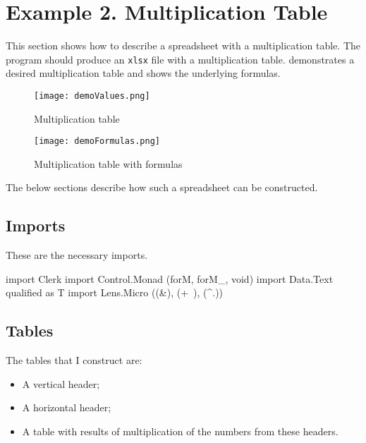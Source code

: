 


\section{Example 2. Multiplication Table}
\label{sec:ex2}

This section shows how to describe a spreadsheet with a multiplication table. The program should produce an \texttt{xlsx} file with a multiplication table.  demonstrates a desired multiplication table and  shows the underlying formulas.

\begin{figure}[h]
  \centering
  \texttt{[image: demoValues.png]}
  \caption{Multiplication table}
  \label{fig:mult}
\end{figure}

\begin{figure}[h]
  \centering
  \texttt{[image: demoFormulas.png]}
  \caption{Multiplication table with formulas}
  \label{fig:mult_formulas}
\end{figure}

The below sections describe how such a spreadsheet can be constructed.

\subsection{Imports}

These are the necessary imports.

\begin{mycode}
import Clerk
import Control.Monad (forM, forM_, void)
import Data.Text qualified as T
import Lens.Micro ((&), (+~), (^.))
\end{mycode}

\subsection{Tables}

The tables that I construct are:

\begin{itemize}
  \item A vertical header;
  \item A horizontal header;
  \item A table with results of multiplication of the numbers from these headers.
\end{itemize}

